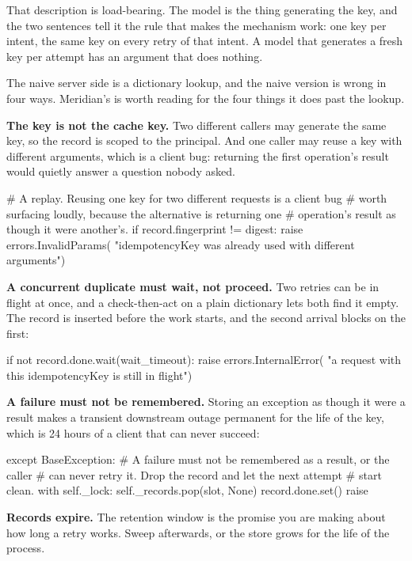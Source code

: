 That description is load-bearing. The model is the thing generating the key, and
the two sentences tell it the rule that makes the mechanism work: one key per
intent, the same key on every retry of that intent. A model that generates a
fresh key per attempt has an argument that does nothing.

The naive server side is a dictionary lookup, and the naive version is wrong in
four ways. Meridian's is worth reading for the four things it does past the
lookup.

\textbf{The key is not the cache key.} Two different callers may generate the
same key, so the record is scoped to the principal. And one caller may reuse a
key with different arguments, which is a client bug: returning the first
operation's result would quietly answer a question nobody asked.

\begin{py}
# A replay. Reusing one key for two different requests is a client bug
# worth surfacing loudly, because the alternative is returning one
# operation's result as though it were another's.
if record.fingerprint != digest:
    raise errors.InvalidParams(
        "idempotencyKey was already used with different arguments")
\end{py}

\textbf{A concurrent duplicate must wait, not proceed.} Two retries can be in
flight at once, and a check-then-act on a plain dictionary lets both find it
empty. The record is inserted before the work starts, and the second arrival
blocks on the first:

\begin{py}
if not record.done.wait(wait_timeout):
    raise errors.InternalError(
        "a request with this idempotencyKey is still in flight")
\end{py}

\textbf{A failure must not be remembered.} Storing an exception as though it
were a result makes a transient downstream outage permanent for the life of the
key, which is 24 hours of a client that can never succeed:

\begin{py}
except BaseException:
    # A failure must not be remembered as a result, or the caller
    # can never retry it. Drop the record and let the next attempt
    # start clean.
    with self._lock:
        self._records.pop(slot, None)
    record.done.set()
    raise
\end{py}

\textbf{Records expire.} The retention window is the promise you are making
about how long a retry works. Sweep afterwards, or the store grows for the life
of the process.

